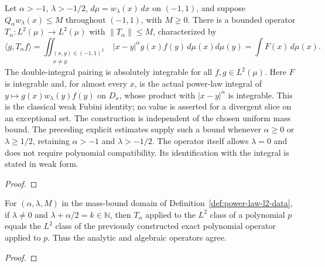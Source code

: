 \begin{supporting}
\begin{theorem}
\label{thm:power-law-l2-operator}
\leanok
Let $\alpha>-1$, $\lambda>-1/2$, $d\mu=w_\lambda(x)\,dx$ on $(-1,1)$,
and suppose $Q_\alpha w_\lambda(x)\le M$ throughout $(-1,1)$, with $M\ge0$.
There is a bounded operator $T_\alpha:L^2(\mu)\to L^2(\mu)$ with
$\|T_\alpha\|\le M$, characterized by
\[
 \langle g,T_\alpha f\rangle
 =\iint_{\substack{(x,y)\in(-1,1)^2\\x\ne y}} |x-y|^\alpha g(x)f(y)\,d\mu(x)d\mu(y)
 =\int F(x)\,d\mu(x).
\]
The double-integral pairing is absolutely integrable for all $f,g\in L^2(\mu)$.
Here $F$ is integrable and, for almost every $x$, is the actual power-law
integral of $y\mapsto g(x)w_\lambda(y)f(y)$ on $D_x$, whose product with $|x-y|^\alpha$ is integrable.
This is the classical weak Fubini identity; no value is asserted for a
divergent slice on an exceptional set.
The construction is independent of the chosen uniform mass bound.
The preceding explicit estimates supply such a bound whenever $\alpha\ge0$
or $\lambda\ge1/2$, retaining $\alpha>-1$ and $\lambda>-1/2$.
The operator itself allows $\lambda=0$ and does not require polynomial compatibility.
Its identification with the integral is stated in weak form.
\end{theorem}
\begin{proof}
\leanok
\end{proof}

\begin{theorem}
\label{thm:power-law-l2-compatible}
\leanok
For $(\alpha,\lambda,M)$ in the mass-bound domain of Definition~\ref{def:power-law-l2-data}, if $\lambda\ne0$ and
$\lambda+\alpha/2=k\in\mathbb N$, then $T_\alpha$ applied to the $L^2$ class
of a polynomial $p$ equals the $L^2$ class of the previously constructed exact
polynomial operator applied to $p$. Thus the analytic and algebraic operators agree.
\end{theorem}
\begin{proof}
\leanok
\end{proof}



\end{supporting}

